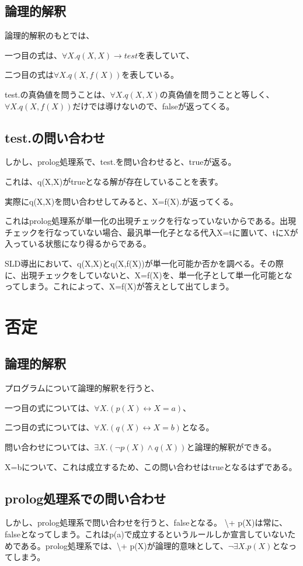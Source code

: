 \documentclass[uplatex,12pt]{jsarticle}
\begin{document}
\subsection{論理的解釈}
論理的解釈のもとでは、

一つ目の式は、$\forall X. q(X,X) \rightarrow test$を表していて、

二つ目の式は$\forall X. q(X,f(X))$を表している。

test.の真偽値を問うことは、$\forall X. q(X,X)$の真偽値を問うことと等しく、$\forall X. q(X,f(X))$だけでは導けないので、falseが返ってくる。

\subsection{test.の問い合わせ}
しかし、prolog処理系で、test.を問い合わせると、trueが返る。

これは、q(X,X)がtrueとなる解が存在していることを表す。

実際にq(X,X)を問い合わせしてみると、X=f(X).が返ってくる。

これはprolog処理系が単一化の出現チェックを行なっていないからである。出現チェックを行なっていない場合、最汎単一化子となる代入X=tに置いて、tにXが入っている状態になり得るからである。

SLD導出において、q(X,X)とq(X,f(X))が単一化可能か否かを調べる。その際に、出現チェックをしていないと、X=f(X)を、単一化子として単一化可能となってしまう。これによって、X=f(X)が答えとして出てしまう。


\section{否定}

\subsection{論理的解釈}
プログラムについて論理的解釈を行うと、

一つ目の式については、$\forall X.(p(X) \leftrightarrow X=a)$、

二つ目の式については、$\forall X.(q(X) \leftrightarrow X=b)$となる。

問い合わせについては、$\exists X.(\lnot p(X) \land q(X))$と論理的解釈ができる。

X=bについて、これは成立するため、この問い合わせはtrueとなるはずである。

\subsection{prolog処理系での問い合わせ}
しかし、prolog処理系で問い合わせを行うと、falseとなる。
\backslash + p(X)は常に、falseとなってしまう。これはp(a)で成立するというルールしか宣言していないためである。prolog処理系では、\backslash + p(X)が論理的意味として、$\lnot \exists X.p(X)$となってしまう。
\end{document}
